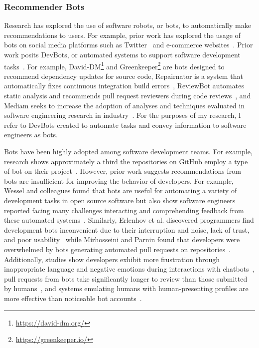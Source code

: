 \subsubsection{Recommender Bots}

Research has explored the use of software robots, or bots, to automatically make recommendations to users. For example, prior work has explored the usage of bots on social media platforms such as Twitter~\cite{Edwards14BotSocialMedia} and e-commerce websites~\cite{Reddy18BoteCommerce}. Prior work posits DevBots, or automated systems to support software development tasks~\cite{DevBots}. For example, David-DM\footnote{\url{https://david-dm.org/}} and Greenkeeper\footnote{\url{https://greenkeeper.io/}} are bots designed to recommend dependency updates for source code, Repairnator is a system that automatically fixes continuous integration build errors~\cite{Repairnator}, ReviewBot automates static analysis and recommends pull request reviewers during code reviews~\cite{ReviewBot}, and Mediam seeks to increase the adoption of analyses and techniques evaluated in software engineering research in industry~\cite{beschastnikh2017accelerating}. For the purposes of my research, I refer to DevBots created to automate tasks and convey information to software engineers as bots.

Bots have been highly adopted among software development teams. For example, research shows approximately a third the repositories on GitHub employ a type of bot on their project~\cite{wessel2018power}. However, prior work suggests recommendations from bots are insufficient for improving the behavior of developers. For example, Wessel and colleagues found that bots are useful for automating a variety of development tasks in open source software but also show software engineers reported facing many challenges interacting and comprehending feedback from these automated systems~\cite{wessel2018power}. Similarly, Erlenhov et al. discovered programmers find development bots inconvenient due to their interruption and noise, lack of trust, and poor usability~\cite{Erlenhov20EmpStudyBots} while Mirhosseini and Parnin found that developers were overwhelmed by bots generating automated pull requests on repositories~\cite{Samim2017AutoPullRequests}. Additionally, studies show developers exhibit more frustration through inappropriate language and negative emotions during interactions with chatbots~\cite{Hill2015Chatbots}, pull requests from bots take significantly longer to review than those submitted by humans~\cite{Wyrich21Waiting}, and systems emulating humans with human-presenting profiles are more effective than noticeable bot accounts~\cite{murgia16machines}. 

